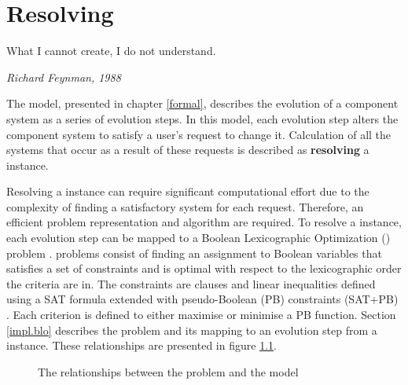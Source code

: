 \chapter{Resolving \modelname}
\label{implementation}
\epigraph{What I cannot create, I do not understand.}
{\textit{Richard Feynman, 1988}}
The \modelname model, presented in chapter \ref{formal}, describes the evolution of a component system as a series of evolution steps.
In this model, each evolution step alters the component system to satisfy a user's request to change it.
Calculation of all the systems that occur as a result of these requests is described as \textbf{resolving} a \modelname instance.

Resolving a \modelname instance can require significant computational effort due to the complexity of finding a satisfactory system for each request.
Therefore, an efficient problem representation and algorithm are required.
To resolve a \modelname instance, each evolution step can be mapped to a Boolean Lexicographic Optimization (\modelimpl) problem \citep{marque2011blex}.
\modelimpl problems consist of finding an assignment to Boolean variables that satisfies a set of constraints and is optimal with respect to the lexicographic order the criteria are in.
The constraints are clauses and linear inequalities defined using a SAT formula extended with pseudo-Boolean (PB) constraints (SAT+PB) \citep{dixon2004automating}.
Each criterion is defined to either maximise or minimise a PB function.
Section \ref{impl.blo} describes the \modelimpl problem and its mapping to an evolution step from a \modelname instance.
These relationships are presented in figure \ref{impl.modelsatdiagram}.

\begin{figure}[htp]
\begin{center}
  \caption{The relationships between the \modelimpl problem and the \modelname model}
  \label{impl.modelsatdiagram}
\end{center}
\end{figure}

